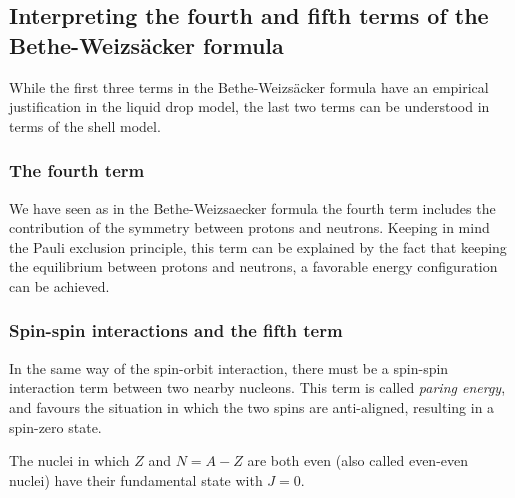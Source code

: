 \subsection{Interpreting the fourth and fifth terms of the Bethe-Weizs\"acker formula}
While the first three terms in the Bethe-Weizs\"acker formula have an empirical justification in the liquid drop model, the last two terms can be understood in terms of the shell model.

\subsubsection*{The fourth term}
We have seen as in the Bethe-Weizsaecker formula the fourth term includes the contribution of the symmetry between protons and neutrons. Keeping in mind the Pauli exclusion principle, this term can be explained by the fact that keeping the equilibrium between protons and neutrons, a favorable energy configuration can be achieved.

\subsubsection*{Spin-spin interactions and the fifth term}
In the same way of the spin-orbit interaction, there must be a spin-spin interaction term between two nearby nucleons. This term is called \textit{paring energy}, and favours the situation in which the two spins are anti-aligned, resulting in a spin-zero state.

The nuclei in which \(Z\) and \(N = A - Z\) are both even (also called even-even nuclei) have their fundamental state with $J = 0$.

